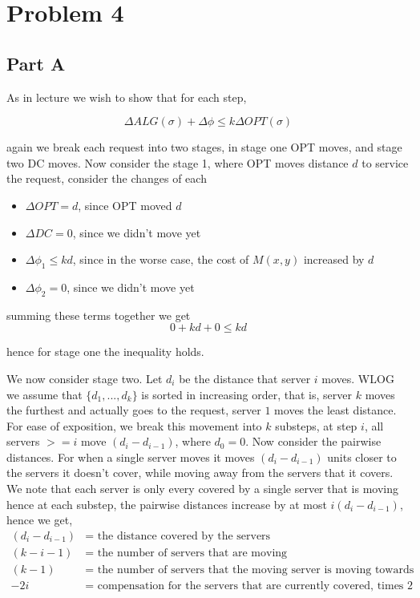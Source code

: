 \documentclass[a4paper]{article}
\begin{document}
\section{Problem 4}
\subsection{Part A}

As in lecture we wish to show that for each step, 

\begin{equation}
\Delta ALG(\sigma) + \Delta\phi \leq k \Delta OPT(\sigma)
\end{equation}

again we break each request into two stages, in stage one OPT moves, 
and stage two DC moves. Now consider the stage 1, where OPT moves distance $d$ to service the 
request, consider the changes of each 

\begin{itemize}
		\item $\Delta OPT = d$, since OPT moved $d$
		\item $\Delta DC = 0$, since we didn't move yet
		\item $\Delta\phi_1 \leq kd$, since in the worse case, the cost of $M(x,y)$ increased by $d$
		\item $\Delta\phi_2 = 0$, since we didn't move yet
\end{itemize}

summing these terms together we get 
$$
0 + kd  + 0 \leq kd
$$

hence for stage one the inequality holds.

We now consider stage two. Let $d_i$ be the distance 
that server $i$ moves. WLOG we assume that $\{d_1, ..., d_k\}$ is 
sorted in increasing order, that is, server $k$ moves the furthest and 
actually goes to the request, server $1$ moves the least distance. For ease of exposition,
we break this movement into $k$ substeps, at step $i$, all servers $>= i$ move $(d_i - d_{i-1})$,
where $d_0 = 0$. Now consider the pairwise distances. For when a single server moves it 
moves $(d_i - d_{i-1})$ units closer to the servers it doesn't cover, while moving away from 
the servers that it covers. We note that each server is only every covered by a single server
that is moving hence at each substep, the pairwise distances increase by at most $i(d_i - d_{i-1})$,
hence we get,
\begin{align*}
	(d_i - d_{i-1}) &= \text{ the distance covered by the servers}\\
	(k-i-1) &= \text{ the number of servers that are moving}\\
	(k-1) &= \text{ the number of servers that the moving server is moving towards}\\
	-2i &= \text{ compensation for the servers that are currently covered, times 2 because the previous term counts the distance as decreasing}
\end{align*}
\end{document}

